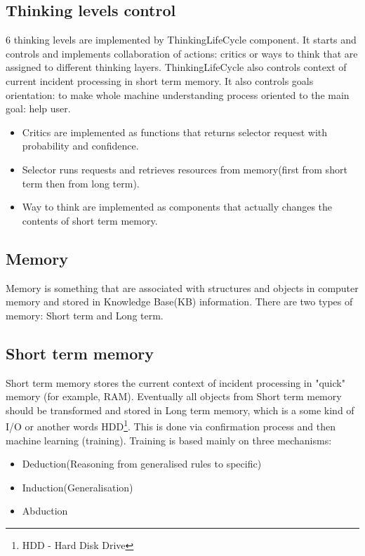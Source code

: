 \documentclass[conference]{IEEEtran}
\begin{document}
\subsection{Thinking levels control}

6 thinking levels are implemented by ThinkingLifeCycle component. It starts and controls and implements collaboration of actions: critics or ways to think that are assigned to different thinking layers. ThinkingLifeCycle also controls context of current incident processing in short term memory. It also controls goals orientation: to make whole machine understanding process oriented to the main goal: help user.\\

\begin{itemize}
  \item Critics are implemented as functions that returns selector request with probability and confidence.
  \item Selector runs requests and retrieves resources from memory(first from short term then from long term).
  \item Way to think are implemented as components that actually changes the contents of short term memory.
\end{itemize}

\subsection{Memory}

Memory is something that are associated with structures and objects in computer memory and stored in Knowledge Base(KB) information.
There are two types of memory: Short term and Long term.

\subsection{Short term memory}

Short term memory stores the current context of incident processing in "quick" memory (for example, RAM). Eventually all objects from Short term memory should be transformed and stored in Long term memory, which is a some kind of I/O or another words HDD\footnote{HDD - Hard Disk Drive}. This is done via confirmation process and then machine learning (training).
Training is based mainly on three mechanisms:
\begin{itemize}
  \item Deduction(Reasoning from generalised rules to specific)
  \item Induction(Generalisation)
  \item Abduction
\end{itemize}
\end{document}
